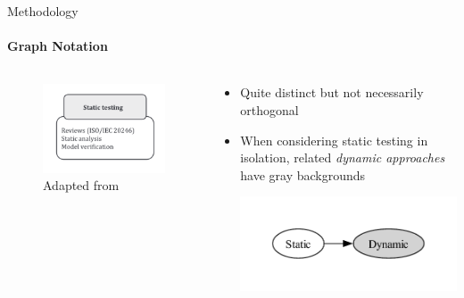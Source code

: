 \documentclass{beamer}
\begin{document}
\begin{frame}{Methodology}
    \framesubtitle{Graph Notation}
    \begin{columns}[c]
        \begin{column}{.4\textwidth}
            \begin{figure}
                \centering
                \includegraphics[width=\linewidth]{assets/images/test approach static testing}
                \caption{\tiny Adapted from \citep[Fig.~2]{IEEE2022}}
            \end{figure}
        \end{column}
        \begin{column}{.6\textwidth}
            \begin{itemize}
                \item \pause Quite distinct but not necessarily orthogonal
                \item \pause When considering static testing in isolation,
                      related \emph{dynamic approaches} have gray backgrounds

                      \vspace{-0.5cm}
                      \includegraphics[width=\linewidth]{assets/graphs/manual/catRels9.pdf}
            \end{itemize}
        \end{column}
    \end{columns}
\end{frame}
\end{document}
